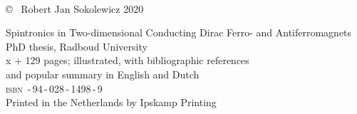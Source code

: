 \frenchspacing
\raggedbottom

\thispagestyle{empty}
\vspace*{4em}
\begin{center}
\huge{}\\
\end{center}
\newpage

\thispagestyle{empty}
\null
\vfill

\setlength{\marginparwidth}{2em}
\setlength{\marginparsep}{0.75em}

\noindent \copyright~ Robert Jan Sokolewicz 2020


\noindent Spintronics in Two-dimensional Conducting Dirac Ferro- and Antiferromagnets\\
PhD thesis, Radboud University\\
x + 129 pages; illustrated, with bibliographic references \\ and popular summary in English and Dutch\\[2ex]
{\scshape isbn} \,-\,94\,-\,028\,-\,1498\,-\,9\\[2ex]
Printed in the Netherlands by Ipskamp Printing\\[2ex]


